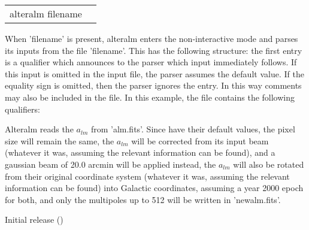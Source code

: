 \begin{examples}{2}
{
\begin{tabular}{ll} %
alteralm  filename \\
\end{tabular}
}
{When 'filename' is present, alteralm enters the non-interactive mode and parses
its inputs from the file 'filename'. This has the following
structure: the first entry is a qualifier which announces to the parser
which input immediately follows. If this input is omitted in the
input file, the parser assumes the default value.
If the equality sign is omitted, then the parser ignores the entry.
In this way comments may also be included in the file.
In this example, the file contains the following qualifiers:\hfill\newline
{}

Alteralm reads the $a_{lm}$ from 'alm.fits'. Since \hfill\newline
{}
have their default values, the pixel size will remain the same, the $a_{lm}$ will be corrected
from its input beam (whatever it was, assuming the relevant information can be
found), and a gaussian beam of 20.0 arcmin will be applied
instead, the $a_{lm}$ will also be rotated from their original coordinate system
(whatever it was, assuming the relevant information can be found)
into Galactic coordinates, assuming a year 2000 epoch for both,
 and only the multipoles up to 512 will be written in
'newalm.fits'.
}
\end{examples}

\begin{release}
  \begin{relist}
    \item Initial release ()
  \end{relist}
\end{release}

